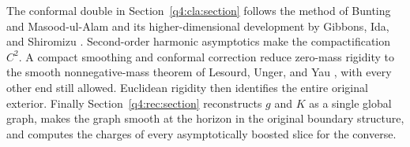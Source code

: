 The conformal double in Section~\ref{q4:cla:section} follows the method of
Bunting and Masood-ul-Alam and its higher-dimensional development by
Gibbons, Ida, and Shiromizu
\cite{BuntingMasoodUlAlam1987,GibbonsIdaShiromizu2002}.
Second-order harmonic asymptotics make the compactification $C^2$.
A compact smoothing and conformal correction reduce zero-mass rigidity
to the smooth nonnegative-mass theorem of Lesourd, Unger, and Yau
\cite[Theorem~1.2 and Definition~1.9, arXiv version~1]{LesourdUngerYau2021},
with every other end still allowed. Euclidean rigidity then identifies
the entire original exterior. Finally
Section~\ref{q4:rec:section} reconstructs $g$ and $K$ as a single global
graph, makes the graph smooth at the horizon in the original boundary
structure, and computes the charges of every asymptotically boosted
slice for the converse.
